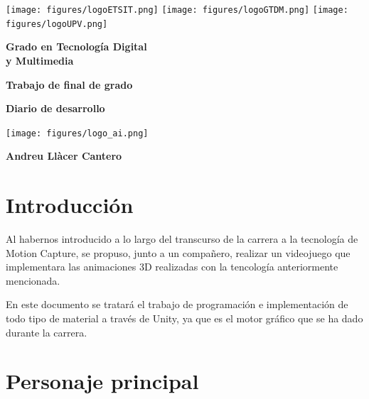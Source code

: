 \documentclass[12pt,spanish]{article}
\begin{document}
\begin{titlepage}
  \begin{center}
	\texttt{[image: figures/logoETSIT.png]}
	\hfill
	\texttt{[image: figures/logoGTDM.png]}
	\hfill
	\texttt{[image: figures/logoUPV.png]}
	\hfill
    
    \vspace{0.5cm}
    
    \textbf{Grado en Tecnología Digital\\y Multimedia}
    
    \vspace{4cm}
    
    \textbf{Trabajo de final de grado}
    
    \vspace{1cm}
        
    \large
    \textbf{\Huge Diario de desarrollo}
    
    \vspace{0.5cm}
    
    \texttt{[image: figures/logo\_ai.png]}
    
    
    \vspace{7.5cm}
    
    \textbf{Andreu Llàcer Cantero}


    \vfill
    
  \end{center}
\end{titlepage}

\newpage

\tableofcontents

\newpage

\section{Introducción}

    Al habernos introducido a lo largo del transcurso de la carrera a la tecnología de Motion Capture, se propuso, junto a un compañero, realizar un videojuego que implementara las animaciones 3D realizadas con la tencología anteriormente mencionada.

    En este documento se tratará el trabajo de programación e implementación de todo tipo de material a través de Unity, ya que es el motor gráfico que se ha dado durante la carrera.

\section{Personaje principal}
\end{document}
